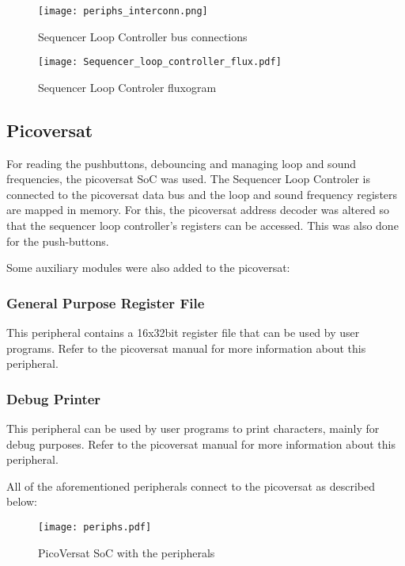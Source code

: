     \begin{figure}[!htbp]
      \centerline{\texttt{[image: periphs\_interconn.png]}}
      \vspace{0cm}\caption{Sequencer Loop Controller bus connections}
      \label{fig:periphs}
  \end{figure}

\begin{figure}[!htbp]
  \centerline{\texttt{[image: Sequencer\_loop\_controller\_flux.pdf]}}
  \vspace{0cm}\caption{Sequencer Loop Controler fluxogram}
  \label{fig:bd}
\end{figure}


\subsection{Picoversat}

For reading the pushbuttons, debouncing and managing loop and sound frequencies, the picoversat SoC was used. The Sequencer Loop Controler is connected to the picoversat data bus and the loop and sound frequency registers are mapped in memory. For this, the picoversat address decoder was altered so that the sequencer loop controller's registers can be accessed. This was also done for the push-buttons.

Some auxiliary modules were also added to the picoversat:

\subsubsection{General Purpose Register File}

This peripheral contains a 16x32bit register file that can be used by user
programs. Refer to the picoversat manual for more information about this peripheral. 


\subsubsection{Debug Printer}

This peripheral can be used by user programs to print characters, mainly for
debug purposes. Refer to the picoversat manual for more information about this peripheral.


All of the aforementioned peripherals connect to the picoversat as described below:

\begin{figure}[!htbp]
  \centerline{\texttt{[image: periphs.pdf]}}
  \vspace{0cm}\caption{PicoVersat SoC with the peripherals}
  \label{fig:periphs}
\end{figure}

